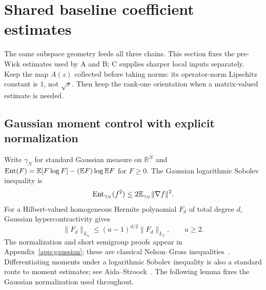 \documentclass[11pt]{article}
\numberwithin{equation}{section}
\theoremstyle{definition}\newtheorem{definition}[theorem]{Definition}
\theoremstyle{remark}\newtheorem{remark}[theorem]{Remark}
\newcommand{\R}{\mathbb R}\newcommand{\E}{\mathbb E}\newcommand{\Prob}{\mathbb P}
\newcommand{\norm}[1]{\lVert#1\rVert}\newcommand{\ip}[2]{\langle#1,#2\rangle}
\begin{document}
\section{Shared baseline coefficient estimates}\label{sec:common}
\begin{takeaway}
The same subspace geometry feeds all three chains. This section fixes the
pre-Wick estimates used by A and B; C supplies sharper local inputs separately. Keep the map $A(z)$ collected before
taking norms: its operator-norm Lipschitz constant is $1$, not $\sqrt r$.
Then keep the rank-one orientation when a matrix-valued estimate is needed.
\end{takeaway}

\subsection{Gaussian moment control with explicit normalization}
Write $\gamma_N$ for standard Gaussian measure on $\R^N$ and
$\Ent(F)=\E[F\log F]-(\E F)\log\E F$ for $F\ge0$.
The Gaussian logarithmic Sobolev inequality is
\begin{equation}\label{eq:LSI}
 \Ent_{\gamma_N}(f^2)\le2\E_{\gamma_N}\norm{\nabla f}^2.
\end{equation}
For a Hilbert-valued homogeneous Hermite polynomial $F_d$ of total degree $d$,
Gaussian hypercontractivity gives
\begin{equation}\label{eq:HC}
 \norm{F_d}_{L_u}\le(u-1)^{d/2}\norm{F_d}_{L_2},\qquad u\ge2.
\end{equation}
The normalization and short semigroup proofs appear in Appendix~\ref{app:gaussian};
these are classical Nelson--Gross inequalities~\cite{Nelson,Gross,GrossSurvey}.
Differentiating moments under a logarithmic Sobolev inequality is also a standard
route to moment estimates; see Aida--Stroock~\cite{AidaStroock}.
The following lemma fixes the Gaussian normalization used throughout.
\end{document}
